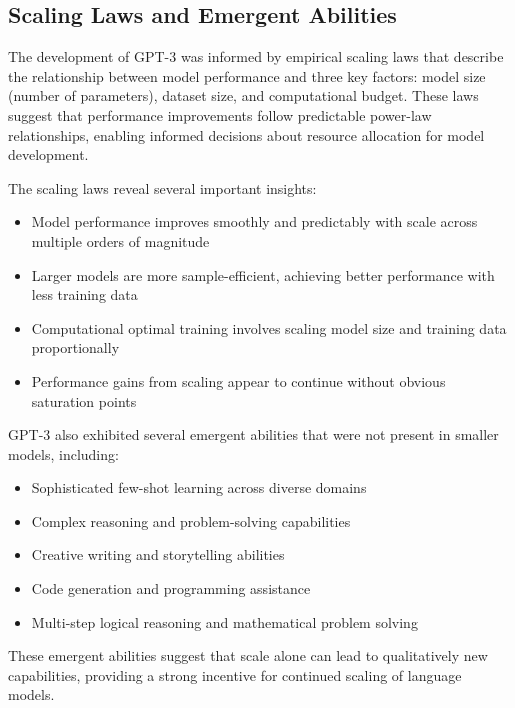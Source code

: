 \subsection{Scaling Laws and Emergent Abilities}

The development of GPT-3 was informed by empirical scaling laws that describe the relationship between model performance and three key factors: model size (number of parameters), dataset size, and computational budget. These laws suggest that performance improvements follow predictable power-law relationships, enabling informed decisions about resource allocation for model development.


The scaling laws reveal several important insights:
\begin{itemize}
    \item Model performance improves smoothly and predictably with scale across multiple orders of magnitude
    \item Larger models are more sample-efficient, achieving better performance with less training data
    \item Computational optimal training involves scaling model size and training data proportionally
    \item Performance gains from scaling appear to continue without obvious saturation points
\end{itemize}

GPT-3 also exhibited several emergent abilities that were not present in smaller models, including:
\begin{itemize}
    \item Sophisticated few-shot learning across diverse domains
    \item Complex reasoning and problem-solving capabilities
    \item Creative writing and storytelling abilities
    \item Code generation and programming assistance
    \item Multi-step logical reasoning and mathematical problem solving
\end{itemize}

These emergent abilities suggest that scale alone can lead to qualitatively new capabilities, providing a strong incentive for continued scaling of language models.

